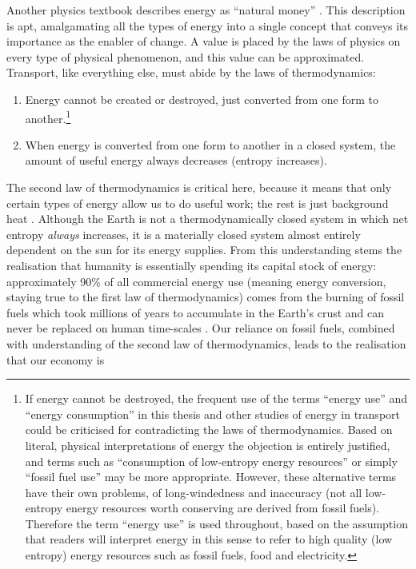 Another physics textbook describes energy as ``natural money''
\citep[p.~269]{Knight2007}. This description is apt, amalgamating all the
types of energy into a single concept that conveys its importance as the
enabler of change. A value is placed by the laws of physics on
every type of physical phenomenon, and this value can be approximated.
Transport, like everything else, must abide by the laws of
thermodynamics:
\begin{enumerate}
 \item Energy cannot be created or destroyed, just converted from one form to
another.\footnote{If energy cannot be destroyed, the frequent use of the
terms ``energy use'' and ``energy consumption'' in this
thesis and other studies of energy in transport could be criticised for
contradicting the laws of thermodynamics. Based on literal, physical
interpretations of energy the objection is entirely justified, and terms such
as ``consumption of low-entropy energy resources'' or simply ``fossil fuel
use'' may be more appropriate. However, these alternative terms have their
own problems, of long-windedness and inaccuracy (not all low-entropy energy
resources worth conserving are derived from fossil fuels). Therefore the term
``energy use'' is used throughout, based on the assumption that readers will
interpret energy in this sense to refer to high quality (low entropy) energy
resources such as fossil fuels, food and electricity.}
\item When energy is converted from one form to another in a closed
system, the amount of useful energy always decreases (entropy increases).
\end{enumerate}
The second law of thermodynamics is critical here, because it means that only
certain types of energy allow us to do useful work; the rest is just background
heat \citep{Soddy1912}. Although the Earth is not a thermodynamically closed
system in which net entropy \emph{always} increases, it is a materially closed
system almost entirely dependent on the sun for its energy supplies. From this
understanding stems the realisation that humanity is essentially spending its
capital stock of energy: approximately 90\% of all commercial energy use
(meaning energy conversion, staying true to the first law of thermodynamics)
comes from the burning of fossil fuels which took millions of years to
accumulate in the Earth's crust and can never be replaced on human time-scales
\citep{Smil2008}. Our reliance on fossil fuels, combined with understanding of
the second law of thermodynamics, leads to the realisation that our economy is
